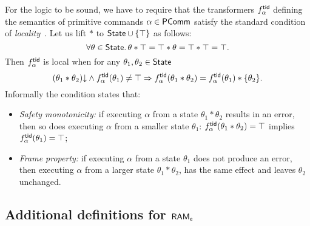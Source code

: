 For the logic to be sound, we have to require that the transformers $f^{{\sf tid}}_ \alpha$
defining the semantics of primitive commands $ \alpha\in{\sf PComm}$ satisfy the standard
condition of {\em locality}~\cite{asl}.  Let us lift $*$ to ${\sf State} \cup
\{\top\}$ as follows:
$$
\forall \theta \in {\sf State}.\,\theta * \top = \top * \theta = \top * \top = \top.
$$
Then $f^{{\sf tid}}_ \alpha$ is local when for any $\theta_1, \theta_2\in {\sf State}$
$$
{(\theta_1*\theta_2)\mathpunct{\downarrow}} \wedge f^{{\sf tid}}_ \alpha (\theta_1) \not= \top \Rightarrow
f^{{\sf tid}}_ \alpha (\theta_1*\theta_2) = f^{{\sf tid}}_ \alpha (\theta_1)*\{\theta_2\}.  
$$
Informally the condition states that:
\begin{itemize}
\item {\em Safety monotonicity:} if executing $ \alpha$ from a state
  $\theta_1*\theta_2$ results in an error, then so does executing $ \alpha$ from a
  smaller state $\theta_1$: $f^{{\sf tid}}_ \alpha (\theta_1*\theta_2) = \top$ implies
  $f^{{\sf tid}}_ \alpha (\theta_1) = \top$;
\item {\em Frame property:} if executing $ \alpha$ from a state $\theta_1$ does not
  produce an error, then executing $ \alpha$ from a larger state $\theta_1*\theta_2$,
  has the same effect and leaves $\theta_2$ unchanged.
\end{itemize}


\subsection{Additional definitions for ${\sf RAM}_{{\sf e}}$\label{sec:exist2}}


